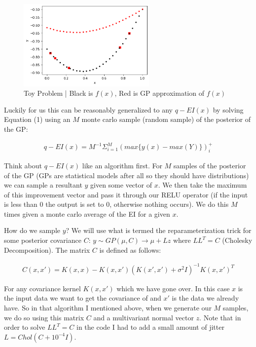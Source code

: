 \documentclass[12pt]{article}
\begin{document}
\begin{figure}[h]
\centering
\includegraphics[width=0.6\textwidth]{Post_16_funct}
\caption{Toy Problem | Black is $f(x)$, Red is GP approximation of $f(x)$}
\end{figure}

Luckily for us this can be reasonably generalized to any $q-EI(x)$ by solving Equation (1) using an $M$ monte carlo sample (random sample) of the posterior of the GP:

\begin{align*}
q-EI(x)=M^{-1} \Sigma_{i=1}^M(max\{y(x)-max(Y)\})^+_i
\end{align*}

\vspace{5mm}

Think about $q-EI(x)$ like an algorithm first. For $M$ samples of the posterior of the GP (GPs are statistical models after all so they should have distributions) we can sample a resultant $y$ given some vector of $x$. We then take the maximum of this improvement vector and pass it through our RELU operator (if the input is less than 0 the output is set to 0, otherwise nothing occurs). We do this $M$ times given a monte carlo average of the EI for a given $x$. 

\vspace{5mm}

How do we sample $y$? We will use what is termed the reparameterization trick for some posterior covariance $C$: $y \sim GP(\mu,C) \rightarrow \mu + Lz$ where $LL^T=C$ (Cholesky Decomposition). The matrix $C$ is defined as follows:

\begin{align*}
C(x,x')=K(x,x)-K(x,x')(K(x',x')+\sigma^2 I)^{-1}K(x,x')^T
\end{align*}

\vspace{5mm}

For any covariance kernel $K(x,x')$ which we have gone over. In this case $x$ is the input data we want to get the covariance of and $x'$ is the data we already have. So in that algorithm I mentioned above, when we generate our $M$ samples, we do so using this matrix $C$ and a multivariant normal vector $z$. Note that in order to solve $LL^T=C$ in the code I had to add a small amount of jitter $L=Chol(C+10^{-4}I)$.
\end{document}
